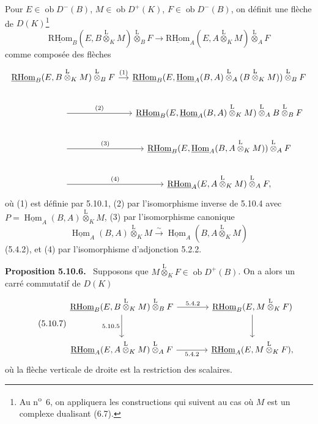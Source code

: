 \documentclass[11pt]{article}
\newenvironment{statement}[1]{\par\medskip\noindent\textbf{#1.}\ }{\par\medskip}
\DeclareMathOperator{\Hom}{Hom}
\newcommand{\R}{\mathrm{R}}\newcommand{\RHomCore}{\mathrm{RHom}}
\newcommand{\ob}{\operatorname{ob}}
\providecommand{\RHom}{\RHomCore}
\providecommand{\uRHom}{\underline{\RHom}}
\providecommand{\uHom}{\underline{\Hom}}
\providecommand{\lten}{\overset{\mathrm L}{\otimes}}
\providecommand{\RHom}{\RHomCore}
\providecommand{\Hom}{\operatorname{Hom}}
\providecommand{\ob}{\operatorname{ob}}
\providecommand{\lten}{\overset{\mathrm L}{\otimes}}
\providecommand{\RHom}{\R\mathcal{H}om}
\providecommand{\lten}{\overset{\mathrm L}{\otimes}}
\providecommand{\R}{\mathrm R}
\providecommand{\lten}{\overset{\mathrm L}{\otimes}}
\providecommand{\lten}{\overset{\mathrm L}{\otimes}}
\providecommand{\lten}{\overset{\mathrm L}{\otimes}}
\providecommand{\RHom}{\RHomCore}
\providecommand{\Hom}{\operatorname{Hom}}
\providecommand{\lten}{\overset{\mathrm L}{\otimes}}
\begin{document}
Pour $E\in\ob D^-(B)$, $M\in\ob D^+(K)$, $F\in\ob D^-(B)$, on définit une flèche de $D(K)$\footnote{Au n\textsuperscript{o}~6, on appliquera les constructions qui suivent au cas où $M$ est un complexe dualisant (6.7).}
\begin{equation}\tag{5.10.5}
\uRHom_B(E,B\lten_KM)\lten_BF\longrightarrow\uRHom_A(E,A\lten_KM)\lten_AF
\end{equation}
comme composée des flèches
\[
\begin{tikzcd}[column sep=small]
\uRHom_B(E,B\lten_KM)\lten_BF \arrow[r,"(1)"] & \uRHom_B(E,\uHom_A(B,A)\lten_A(B\lten_KM))\lten_BF \\
\arrow[r,"(2)"] & \uRHom_B(E,\uHom_A(B,A)\lten_KM)\lten_A B\lten_BF \\
\arrow[r,"(3)"] & \uRHom_B(E,\uHom_A(B,A\lten_KM))\lten_AF \\
\arrow[r,"(4)"] & \uRHom_A(E,A\lten_KM)\lten_AF,
\end{tikzcd}
\]
où (1) est définie par 5.10.1, (2) par l'isomorphisme inverse de 5.10.4 avec $P=\uHom_A(B,A)\lten_KM$, (3) par l'isomorphisme canonique
\[
\uHom_A(B,A)\lten_KM\xrightarrow{\sim}\uHom_A(B,A\lten_KM)
\]
(5.4.2), et (4) par l'isomorphisme d'adjonction 5.2.2.

\begin{statement}{Proposition 5.10.6}
Supposons que $M\lten_KF\in\ob D^+(B)$. On a alors un carré commutatif de $D(K)$
\begin{equation}\tag{5.10.7}
\begin{tikzcd}[column sep=large,row sep=large]
\uRHom_B(E,B\lten_KM)\lten_BF \arrow[r,"5.4.2"] \arrow[d,"5.10.5"'] & \uRHom_B(E,M\lten_KF) \arrow[d]\\
\uRHom_A(E,A\lten_KM)\lten_AF \arrow[r,"5.4.2"'] & \uRHom_A(E,M\lten_KF),
\end{tikzcd}
\end{equation}
où la flèche verticale de droite est la restriction des scalaires.
\end{statement}
\end{document}
